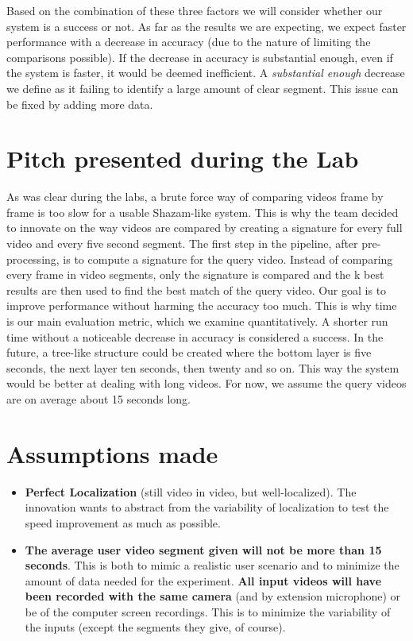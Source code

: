 \documentclass{article}
\newcommand\tab[1][1cm]{\hspace*{#1}}
\begin{document}
\tab Based on the combination of these three factors we will consider whether our system is a success or not. As far as the results we are expecting, we expect faster performance with a decrease in accuracy (due to the nature of limiting the comparisons possible). If the decrease in accuracy is substantial enough, even if the system is faster, it would be deemed inefficient. A \textit{substantial enough} decrease we define as it failing to identify a large amount of clear segment. This issue can be fixed by adding more data. 

\section*{Pitch presented during the Lab}
\tab As was clear during the labs, a brute force way of comparing videos frame by frame is too slow for a usable Shazam-like system. This is why the team decided to innovate on the way videos are compared by creating a signature for every full video and every five second segment. The first step in the pipeline, after pre-processing, is to compute a signature for the query video. Instead of comparing every frame in video segments, only the signature is compared and the k best results are then used to find the best match of the query video.
Our goal is to improve performance without harming the accuracy too much. This is why time is our main evaluation metric, which we examine quantitatively. A shorter run time without a noticeable decrease in accuracy is considered a success.
In the future, a tree-like structure could be created where the bottom layer is five seconds, the next layer ten seconds, then twenty and so on. This way the system would be better at dealing with long videos. For now, we assume the query videos are on average about 15 seconds long.


\section*{Assumptions made}
\begin{itemize}
    \item \textbf{Perfect Localization} (still video in video, but well-localized). The innovation wants to abstract from the variability of localization to test the speed improvement as much as possible.
    \item \textbf{The average user video segment given will not be more than 15 seconds}. This is both to mimic a realistic user scenario and to minimize the amount of data needed for the experiment.
    \textbf{All input videos will have been recorded with the same camera} (and by extension microphone) or be of the computer screen recordings. This is to minimize the variability of the inputs (except the segments they give, of course).
\end{itemize}
\end{document}
